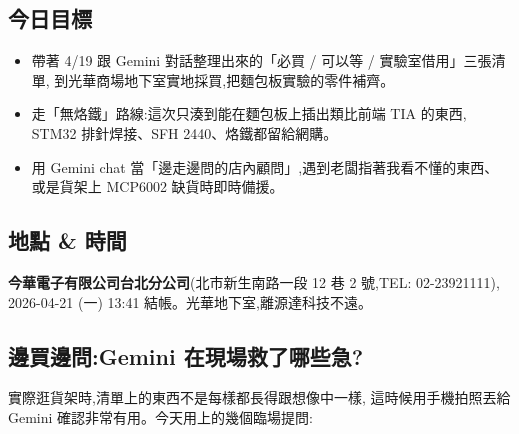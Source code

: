 
\subsection*{今日目標}

\begin{itemize}[leftmargin=2em,itemsep=0pt]
  \item 帶著 4/19 跟 Gemini 對話整理出來的「必買 / 可以等 / 實驗室借用」三張清單,
        到光華商場地下室實地採買,把麵包板實驗的零件補齊。
  \item 走「無烙鐵」路線:這次只湊到能在麵包板上插出類比前端 TIA 的東西,
        STM32 排針焊接、SFH 2440、烙鐵都留給網購。
  \item 用 Gemini chat 當「邊走邊問的店內顧問」,遇到老闆指著我看不懂的東西、
        或是貨架上 MCP6002 缺貨時即時備援。
\end{itemize}

\subsection*{地點 \& 時間}

\textbf{今華電子有限公司台北分公司}(北市新生南路一段 12 巷 2 號,TEL: 02-23921111),
2026-04-21 (一) 13:41 結帳。光華地下室,離源達科技不遠。

\subsection*{邊買邊問:Gemini 在現場救了哪些急?}

實際逛貨架時,清單上的東西不是每樣都長得跟想像中一樣,
這時候用手機拍照丟給 Gemini 確認非常有用。今天用上的幾個臨場提問:

